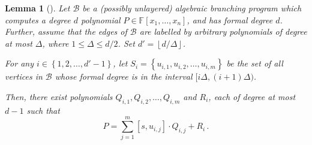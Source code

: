 \documentclass[10pt,a4paper]{article}
\newtheorem{lemma}[theorem]{Lemma}
\newcommand{\F}{\mathbb F}
\newcommand{\set}[1]{\left\{#1\right\}}
\newcommand{\floor}[1]{\left\lfloor#1\right\rfloor}
\begin{document}
\begin{lemma}[\cite{K19}]\label{lem:structure}
	Let $\mathcal{B}$ be a (possibly unlayered) algebraic branching program which computes a degree $d$ polynomial $P\in\F[x_1,\ldots,x_n]$, and has formal degree $d$. Further, assume that the edges of $\mathcal{B}$ are labelled by arbitrary polynomials of degree at most $\Delta$, where $1\le\Delta\le d/2$. Set $d'=\floor{d/\Delta}$.
		
	 For any $i \in \set{1, 2, \ldots ,d'-1}$, let $S_i = \set{u_{i,1}, u_{i,2}, \ldots, u_{i,m}}$ be the set of all vertices in $\mathcal{B}$ whose formal degree is in the interval $[i \Delta, (i+1)\Delta)$.
	 
	 Then, there exist polynomials $Q_{i,1}, Q_{i,2}, \ldots, Q_{i,m}$ and $R_i$, each of degree at most $d-1$ such that
		\[P = \sum_{j=1}^{m} [s, u_{i,j}] \cdot Q_{i,j} + R_i\, .\]
\end{lemma}
\end{document}

